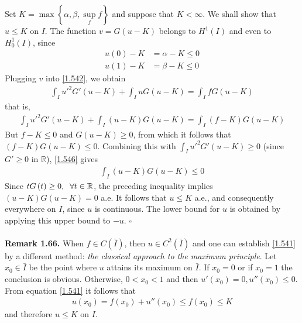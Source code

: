 \documentclass[a4paper,oneside]{article}
\numberwithin{equation}{section}
\begin{document}
Set $K = \max \left\{ {\alpha ,\beta ,\mathop {\sup }\limits_f f} \right\}$ and suppose that $K<\infty$. We shall show that $u\le K$ on $I$. The function $v=G\left(u-K\right)$ belongs to $H^1\left(I\right)$ and even to $H_0^1\left(I\right)$, since
\begin{align}
u\left( 0 \right) - K &= \alpha  - K \le 0\\
u\left( 1 \right) - K &= \beta  - K \le 0
\end{align}
Plugging $v$ into \eqref{1.542}, we obtain
\begin{align}
\int_I {u{'^2}G'\left( {u - K} \right)}  + \int_I {uG\left( {u - K} \right)}  = \int_I {fG\left( {u - K} \right)} 
\end{align}
that is,
\begin{align}
\label{1.546}
\int_I {u{'^2}G'\left( {u - K} \right)}  + \int_I {\left( {u - K} \right)G\left( {u - K} \right)}  = \int_I {\left( {f - K} \right)G\left( {u - K} \right)} 
\end{align}
But $f-K\le 0$ and $G\left(u-K\right) \ge 0$, from which it follows that $\left( {f - K} \right)G\left( {u - K} \right) \le 0$. Combining this with $\int_I {u{'^2}G'\left( {u - K} \right)}  \ge 0$ (since $G' \ge 0$ in $\mathbb{R}$), \eqref{1.546} gives
\begin{align}
\int_I {\left( {u - K} \right)G\left( {u - K} \right)}  \le 0
\end{align}
Since $tG\left(t\right)\ge 0,\hspace{0.2cm}\forall t\in \mathbb{R}$, the preceding inequality implies $\left( {u - K} \right)G\left( {u - K} \right) = 0$ a.e. It follows that $u\le K$ a.e., and consequently everywhere on $I$, since $u$ is continuous. The lower bound for $u$ is obtained by applying this upper bound to $-u$. \hfill $\square$\\
\\
\textbf{Remark 1.66.} When $f\in C\left(\bar I\right)$, then $u\in C^2\left(\bar I\right)$ and one can establish \eqref{1.541} by a different method: \textit{the classical approach to the maximum principle}. Let $x_0\in \bar I$ be the point where $u$ attains its maximum on $\bar I$. If $x_0=0$ or if $x_0=1$ the conclusion is obvious. Otherwise, $0<x_0<1$ and then $u'\left(x_0\right)=0,u''\left(x_0\right)\le 0$. From equation \eqref{1.541} it follows that
\begin{align}
u\left( {{x_0}} \right) = f\left( {{x_0}} \right) + u''\left( {{x_0}} \right) \le f\left( {{x_0}} \right) \le K
\end{align}
and therefore $u\le K$ on $I$.\\
\end{document}

